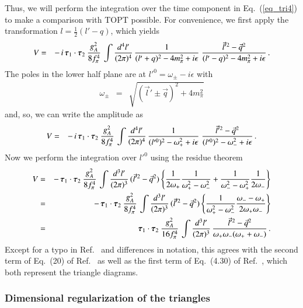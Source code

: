 \documentclass[sort&compress,preprint,3p]{elsarticle}
\newcommand{\bbox}[1]{\mbox{\boldmath $#1$}}
\begin{document}
Thus, we will perform the integration over the time
component in Eq.~(\ref{eq_tri4}) to make a comparison
with TOPT possible.
For convenience,
we first apply the transformation 
$l=\frac 1 2 (l'-q)$, which yields
%
\begin{eqnarray}
V &=& 
 -\, i\, \bbox{\tau}_1 \cdot \bbox{\tau}_2 \:
\frac{g_A^2}{8 f_\pi^4} \,
\int \frac{d^4 l'}{(2\pi)^4} \,
\frac{1}{(l'+q)^2-4m_\pi^2+i\epsilon} \;
\frac{\vec l'^2- \vec q^2}{(l'-q)^2-4m_\pi^2+i\epsilon} 
\,.
\end{eqnarray}
%
The poles in the lower half plane are at $l'^0=\omega_\pm-i\epsilon$ with
\begin{eqnarray}
\omega_\pm &=& \sqrt{(\vec l'\pm \vec q)^2+4m_\pi^2}
\end{eqnarray}
and, so, we can write the amplitude as
%
\begin{eqnarray}
V &=& 
 -\, i\, \bbox{\tau}_1 \cdot \bbox{\tau}_2 \:
\frac{g_A^2}{8 f_\pi^4} \,
\int \frac{d^4 l'}{(2\pi)^4} \,
\frac{1}{(l'^0)^2-\omega_+^2+i\epsilon} \;
\frac{\vec l'^2- \vec q^2}{(l'^0)^2-\omega_-^2+i\epsilon}
\,.
\end{eqnarray}
%
Now we perform the integration over $l'^0$ using the residue theorem
%
\begin{eqnarray}
V &=& 
 -\, \bbox{\tau}_1 \cdot \bbox{\tau}_2 \:
\frac{g_A^2}{8 f_\pi^4} \,
\int \frac{d^3 l'}{(2\pi)^3} \,
(\vec l'^2- \vec q^2) \left\{ 
\frac{1}{2\omega_+} \frac{1}{\omega_+^2-\omega_-^2} +
\frac{1}{\omega_-^2-\omega_+^2} \frac{1}{2\omega_-} \right\}
\nonumber \\
&=& 
 -\, \bbox{\tau}_1 \cdot \bbox{\tau}_2 \:
\frac{g_A^2}{8 f_\pi^4} \,
\int \frac{d^3 l'}{(2\pi)^3} \,
(\vec l'^2- \vec q^2) \left\{ 
\frac{1}{\omega_+^2-\omega_-^2} 
\frac{\omega_--\omega_+}{2\omega_+\omega_-} \right\}
\nonumber \\
&=& 
\: \bbox{\tau}_1 \cdot \bbox{\tau}_2 \:
\frac{g_A^2}{16 f_\pi^4} \,
\int \frac{d^3 l'}{(2\pi)^3} \,
\frac{\vec l'^2- \vec q^2}{\omega_+\omega_-(\omega_++\omega_-)} 
\,.
\end{eqnarray}
%
Except for a typo in Ref.~\cite{ORK96} and differences in notation, 
this agrees with the second term of Eq.~(20)
of Ref.~\cite{ORK96} as well as the first term of
Eq.~(4.30) of Ref.~\cite{EGM98}, which both  represent the triangle diagrams.

\subsubsection{Dimensional regularization of the triangles
\label{sec_dimreg}}
\end{document}
